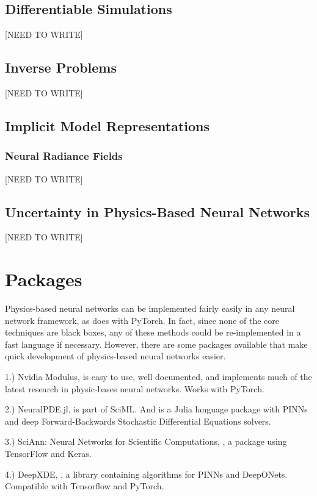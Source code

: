 \documentclass[]{article}
\begin{document}
\subsection{Differentiable Simulations}
[NEED TO WRITE]
\subsection{Inverse Problems}
[NEED TO WRITE]
\subsection{Implicit Model Representations}
\subsubsection{Neural Radiance Fields}
[NEED TO WRITE]
\subsection{Uncertainty in Physics-Based Neural Networks}
[NEED TO WRITE]

\section{Packages}
Physics-based neural networks can be implemented fairly easily in any neural network framework, as \cite{pbdl_book} does with PyTorch.  In fact, since none of the core techniques are black boxes, any of these methods could be re-implemented in a fast language if necessary.  However, there are some packages available that make quick development of physics-based neural networks easier. 

1.) Nvidia Modulus, \cite{nvidia_modulus} is easy to use, well documented, and implements much of the latest research in physic-bases neural networks.  Works with PyTorch.

2.) NeuralPDE.jl, \cite{zubov2021neuralpde} is part of SciML.  And is a Julia language package with PINNs and deep Forward-Backwards Stochastic Differential Equations solvers. 

3.) SciAnn: Neural Networks for Scientific Computations, \cite{haghighat2021sciann}, a package using TensorFlow and Keras.

4.) DeepXDE, \cite{lu2021deepxde},  a library containing algorithms for PINNs and DeepONets.  Compatible with Tensorflow and PyTorch.



\end{document}
